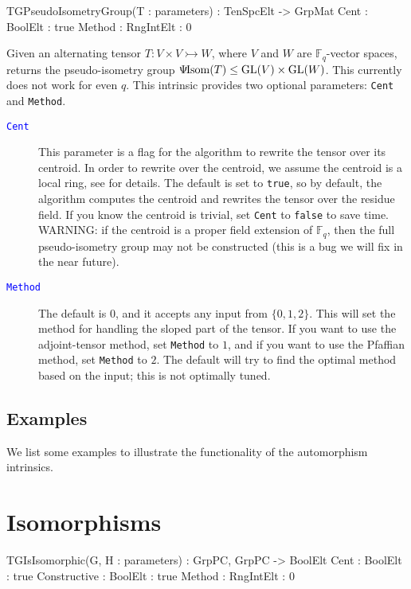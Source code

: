 \documentclass{documentation}
\DeclareMathOperator{\isom}{Isom}
\DeclareMathOperator{\GL}{{\rm GL}}
\newcommand{\pseudo}{\Psi\hspace*{-1mm}\isom}
\begin{document}
\begin{intrinsics}
TGPseudoIsometryGroup(T : parameters) : TenSpcElt -> GrpMat
    Cent : BoolElt : true
    Method : RngIntElt : 0
\end{intrinsics}

Given an alternating tensor $T : V \times V \rightarrowtail W$, where $V$ and $W$ are $\mathbb{F}_q$-vector spaces, returns the pseudo-isometry group $\pseudo(T)\leq \GL(V)\times \GL(W)$.
This currently does not work for even $q$. 
This intrinsic provides two optional parameters: {\tt Cent} and {\tt Method}. 

\begin{description}
\item[\textcolor{blue}{\tt Cent}]
This parameter is a flag for the algorithm to rewrite the tensor over its centroid. 
In order to rewrite over the centroid, we assume the centroid is a local ring, see \cite{eMAGma} for details.
The default is set to {\tt true}, so by default, the algorithm computes the centroid and rewrites the tensor over the residue field.
If you know the centroid is trivial, set {\tt Cent} to {\tt false} to save time.
WARNING: if the centroid is a proper field extension of $\mathbb{F}_q$, then the full pseudo-isometry group may not be constructed (this is a bug we will fix in the near future).
\item[\textcolor{blue}{\tt Method}]
The default is $0$, and it accepts any input from $\{ 0,1,2\}$. 
This will set the method for handling the sloped part of the tensor.
If you want to use the adjoint-tensor method, set {\tt Method} to $1$, and if you want to use the Pfaffian method, set {\tt Method} to $2$. The default will try to find the optimal method based on the input; this is not optimally tuned.
\end{description}

\section{Examples}
We list some examples to illustrate the functionality of the automorphism intrinsics.

\chapter{Isomorphisms}

\begin{intrinsics}
TGIsIsomorphic(G, H : parameters) : GrpPC, GrpPC -> BoolElt
    Cent : BoolElt : true
    Constructive : BoolElt : true
    Method : RngIntElt : 0
\end{intrinsics}
\end{document}
